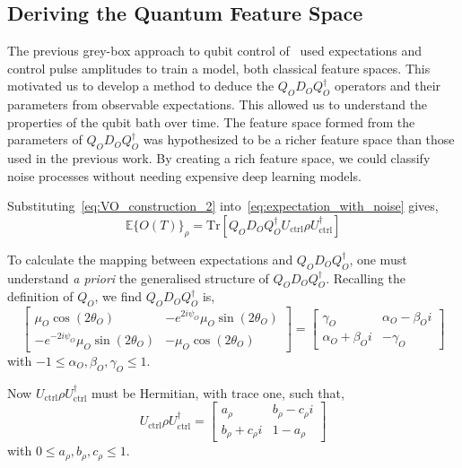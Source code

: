 \documentclass[12pt]{iopart}
\begin{document}
\subsection{Deriving the Quantum Feature Space \label{subsec:deducing_noise_operators}}
The previous grey-box approach to qubit control of~\cite{youssry2020characterization,youssry2022multi} used expectations and control pulse amplitudes to train a model, both classical feature spaces. This motivated us to develop a method to deduce the $Q_{O}D_{O}Q_{O}^{\dagger} $ operators and their parameters from observable expectations. This allowed us to understand the properties of the qubit bath over time. The feature space formed from the parameters of $Q_{O}D_{O}Q_{O}^{\dagger}$ was hypothesized to be a richer feature space than those used in the previous work. By creating a rich feature space, we could classify noise processes without needing expensive deep learning models.

Substituting~\cref{eq:VO_construction_2} into~\cref{eq:expectation_with_noise} gives,
\begin{equation}
    \label{eq:expectationWithNoise3}
 \mathbb{E}\{O(T)\}_\rho = \mathrm{Tr}\left[Q_{O}D_{O}Q_{O}^{\dagger} U_{\mathrm{ctrl}} \rho U_{\mathrm{ctrl}}^{\dagger}\right]
\end{equation}

To calculate the mapping between expectations and $Q_{O}D_{O}Q_{O}^{\dagger}$, one must understand \textit{a priori} the generalised structure of $Q_{O}D_{O}Q_{O}^{\dagger}$. Recalling the definition of $Q_O$, we find $ Q_{O}D_{O}Q_{O}^{\dagger}$ is,
\begin{equation}
 \left[ \begin{array}{cc}
            \mu_O\cos(2\theta_O)
             &
 -e^{2i\psi_O}\mu_O\sin(2\theta_O)
            \\
 -e^{-2i\psi_O}\mu_O\sin(2\theta_O)
             &
 -\mu_O\cos(2\theta_O)
        \end{array} \right] = \left[ \begin{array}{cc}
            \gamma_O             & \alpha_O - \beta_O i \\
            \alpha_O + \beta_O i & -\gamma_O
        \end{array} \right]   \label{eq:QDQDagger}
\end{equation}
with $-1 \leq \alpha_O, \beta_O, \gamma_O \leq 1$.

Now $U_{\mathrm{ctrl}} \rho U_{\mathrm{ctrl}}^{\dagger}$ must be Hermitian, with trace one, such that,
\begin{equation}
 U_{\mathrm{ctrl}} \rho U_{\mathrm{ctrl}}^{\dagger} = \left[\begin{array}{cc}
 a_{\rho}             & b_{\rho} - c_{\rho}i \\
 b_{\rho} + c_{\rho}i & 1 - a_{\rho}
        \end{array}\right] \label{eq:uctrl_rho_uctrl_dag}
\end{equation}
with $0 \leq a_{\rho}, b_{\rho}, c_{\rho} \leq 1$.
\end{document}
